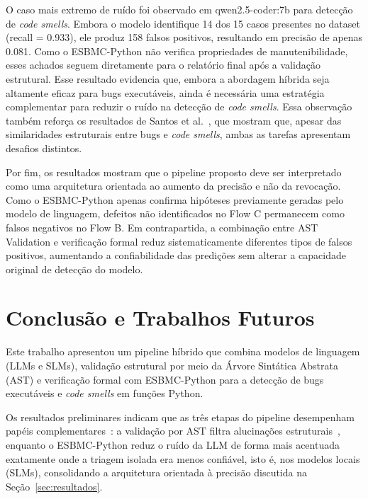 \documentclass[sigconf]{acmart}
\begin{document}
O caso mais extremo de ruído foi observado em qwen2.5-coder:7b para detecção de \textit{code smells}. Embora o modelo identifique 14 dos 15 casos presentes no dataset (recall = 0.933), ele produz 158 falsos positivos, resultando em precisão de apenas 0.081. Como o ESBMC-Python não verifica propriedades de manutenibilidade, esses achados seguem diretamente para o relatório final após a validação estrutural. Esse resultado evidencia que, embora a abordagem híbrida seja altamente eficaz para bugs executáveis, ainda é necessária uma estratégia complementar para reduzir o ruído na detecção de \textit{code smells}. Essa observação também reforça os resultados de Santos et al.~\cite{santos2023yetanothermodel}, que mostram que, apesar das similaridades estruturais entre bugs e \textit{code smells}, ambas as tarefas apresentam desafios distintos.

Por fim, os resultados mostram que o pipeline proposto deve ser interpretado como uma arquitetura orientada ao aumento da precisão e não da revocação. Como o ESBMC-Python apenas confirma hipóteses previamente geradas pelo modelo de linguagem, defeitos não identificados no Flow C permanecem como falsos negativos no Flow B. Em contrapartida, a combinação entre AST Validation e verificação formal reduz sistematicamente diferentes tipos de falsos positivos, aumentando a confiabilidade das predições sem alterar a capacidade original de detecção do modelo.





\section{Conclusão e Trabalhos Futuros}



Este trabalho apresentou um pipeline híbrido que combina modelos de linguagem (LLMs e SLMs), validação estrutural por meio da Árvore Sintática Abstrata (AST) e verificação formal com ESBMC-Python para a detecção de bugs executáveis e \textit{code smells} em funções Python.

Os resultados preliminares indicam que as três etapas do pipeline
desempenham papéis complementares~\cite{tihanyi2025vulnerability}: a
validação por AST filtra alucinações estruturais~\cite{khati2026forge},
enquanto o ESBMC-Python reduz o ruído da LLM de forma mais acentuada
exatamente onde a triagem isolada era menos confiável, isto é, nos
modelos locais (SLMs), consolidando a arquitetura orientada à precisão
discutida na Seção~\ref{sec:resultados}.
\end{document}
